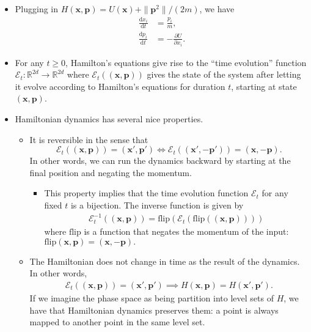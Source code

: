 \documentclass[10pt]{article}
\newcommand{\dee}{\mathrm{d}}
\newcommand{\ve}[1]{\mathbf{#1}}
\newcommand{\mrm}[1]{\mathrm{#1}}
\newcommand{\mcal}[1]{\mathcal{#1}}
\newcommand{\Real}{\mathbb{R}}
\begin{document}
\begin{itemize}
  \item Plugging in $H(\ve{x},\ve{p}) = U(\ve{x}) + \| \ve{p}^2 \|/(2m)$, we have
  \begin{align*}
    \frac{\dee x_i}{\dee t} &= \frac{p_i}{m}, \\
    \frac{\dee p_i}{\dee t} &= -\frac{\partial U}{\partial x_i}.
  \end{align*}

  \item For any $t \geq 0$, Hamilton's equations give rise to the ``time evolution'' function $\mcal{E}_t: \Real^{2d} \rightarrow \Real^{2d}$ where $\mcal{E}_t((\ve{x},\ve{p}))$ gives the state of the system after letting it evolve according to Hamilton's equations for duration $t$, starting at state $(\ve{x},\ve{p})$. 

  \item Hamiltonian dynamics has several nice properties.
  \begin{itemize}
    \item It is reversible in the sense that $$\mcal{E}_t((\ve{x},\ve{p})) = (\ve{x}',\ve{p}') \iff \mcal{E}_t((\ve{x}',-\ve{p}')) = (\ve{x},-\ve{p}).$$
    In other words, we can run the dynamics backward by starting at the final position and negating the momentum.
    \begin{itemize}
      \item This property implies that the time evolution function $\mcal{E}_t$ for any fixed $t$ is a bijection. The inverse function is given by
      \begin{align*}
        \mcal{E}^{-1}_t((\ve{x},\ve{p})) = \mrm{flip}(\mcal{E}_t(\mrm{flip}((\ve{x},\ve{p}))))
      \end{align*}
      where $\mrm{flip}$ is a function that negates the momentum of the input: $\mrm{flip} (\ve{x},\ve{p}) = (\ve{x},-\ve{p}).$
    \end{itemize}
    
    \item The Hamiltonian does not change in time as the result of the dynamics. In other words,
    \begin{align*}
      \mcal{E}_t((\ve{x},\ve{p})) = (\ve{x}',\ve{p}') \implies H(\ve{x},\ve{p}) = H(\ve{x}',\ve{p}').
    \end{align*}
    If we imagine the phase space as being partition into level sets of $H$, we have that Hamiltonian dynamics preserves them: a point is always mapped to another point in the same level set.
    

\end{itemize}
\end{itemize}
\end{document}
